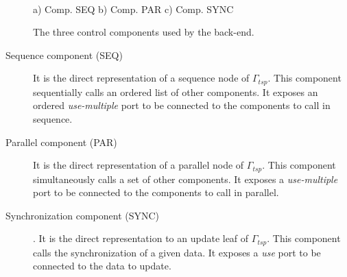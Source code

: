 \begin{figure}[t]
\hspace{\fill}
\hspace{\fill}
\\
a) Comp. SEQ
\hspace{\fill}
b) Comp. PAR
\hspace{\fill}
c) Comp. SYNC
\\
\caption{The three control components used by the back-end.}
\label{fig:ctrlcomponents}
\end{figure}

\begin{description}
\item[Sequence component (SEQ)] It is the direct representation of a sequence node of $\Gamma_{tsp}$. This component sequentially calls an ordered list of other components. It exposes an ordered \emph{use-multiple} port to be connected to the components to call in sequence.

\item[Parallel component (PAR)] It is the direct representation of a parallel node of $\Gamma_{tsp}$. This component simultaneously calls a set of other components. It exposes a \emph{use-multiple} port to be connected to the components to call in parallel.
  
\item[Synchronization component (SYNC)]. It is the direct representation to an update leaf of $\Gamma_{tsp}$. This component calls the synchronization of a given data. It exposes a \emph{use} port to be connected to the data to update.

\end{description}


